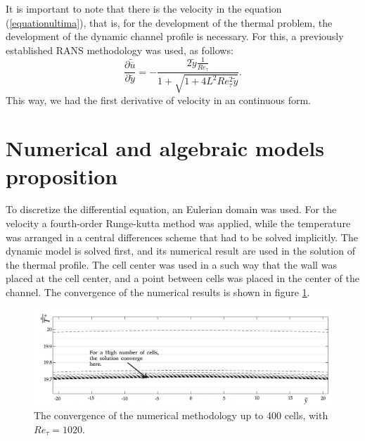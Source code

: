 \documentclass[10pt]{article} %
\begin{document}
It is important to note that there is the velocity in the equation (\ref{equationultima}), that is, for the development of the thermal problem, the development of the dynamic channel profile is necessary. For this, a previously established RANS methodology \cite{Luigi} was used, as follows:
\begin{equation}\label{finalequationvelocity}	
\frac{\partial \tilde{\overline{u}}}{\partial \tilde{y}} = - \frac{2 \tilde{y} \frac{1}{Re_\tau} }{ 1 + \sqrt{ 1 + 4 L ^2 Re_\tau ^2 \tilde{y}}}.
\end{equation}	
This way, we had the first derivative of velocity in an continuous form.


\section{Numerical and algebraic models proposition}


To discretize the differential equation, an Eulerian domain was used. For the velocity a fourth-order Runge-kutta method was applied, while the temperature was arranged in a central differences scheme that had to be solved implicitly. The dynamic model is solved first, and its numerical result are used in the solution of the thermal profile. The cell center was used in a such way that the wall was placed at the cell center, and a point between cells was placed in the center of the channel. The convergence of the numerical results is shown in figure \ref{sistema}.

\begin{figure}[!h]
	\centering
	\includegraphics[angle=0, trim={10mm 0mm 0mm 0mm}, clip , scale=0.30]{fotos_formatacao_final/convergnciaprimeira}
	\caption{The convergence of the numerical methodology up to 400 cells, with $Re_\tau = 1020$.}
	\label{sistema}
\end{figure}
\end{document}
